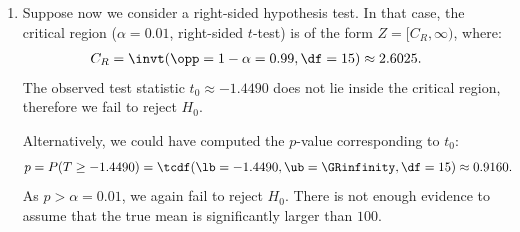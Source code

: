 {\begin{enumerate}[label=(\alph*)]
        There is not enough evidence to reject the claim that the true mean $\mu = 100$.
        \item Suppose now we consider a right-sided hypothesis test.
        In that case, the critical region ($\alpha = 0.01$, right-sided $t$-test) is of the form $Z = [C_R, \infty)$, where:
        \begin{align*}
            C_R &= \invt(\opp=1-\alpha = 0.99, \df=15) \approx 2.6025.
        \end{align*}
        The observed test statistic $t_0 \approx -1.4490$ does not lie inside the critical region, therefore we fail to reject $H_0$.

        Alternatively, we could have computed the $p$-value corresponding to $t_0$:
        \begin{align*}
            p &= P(T \geq -1.4490) = \tcdf(\lb=-1.4490, \ub=\GRinfinity, \df=15) \approx 0.9160.
        \end{align*}
        As $p > \alpha = 0.01$, we again fail to reject $H_0$.
        There is not enough evidence to assume that the true mean is significantly larger than $100$.
    \end{enumerate}
}